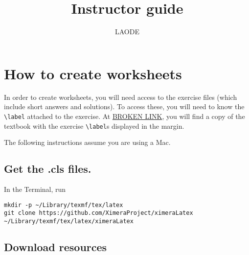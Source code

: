 \documentclass{article}
\title{Instructor guide}
\author{LAODE}
\begin{document}
\maketitle
\tableofcontents

\section{How to create worksheets}\label{how-to-create-worksheets}

In order to create worksheets, you will need access to the exercise
files (which include short answers and solutions).  To access these, you
will need to know the \verb|\label| attached to the exercise.  At
\url{BROKEN LINK}, you will find a copy of the textbook with the
exercise \verb|\label|s displayed in the margin.

The following instructions assume you are using a Mac.

\subsection{Get the .cls files.}\label{get-the-.cls-files.}

In the Terminal, run

\begin{verbatim}
mkdir -p ~/Library/texmf/tex/latex
git clone https://github.com/XimeraProject/ximeraLatex ~/Library/texmf/tex/latex/ximeraLatex
\end{verbatim}

\subsection{Download resources}\label{download-resources}
\end{document}
